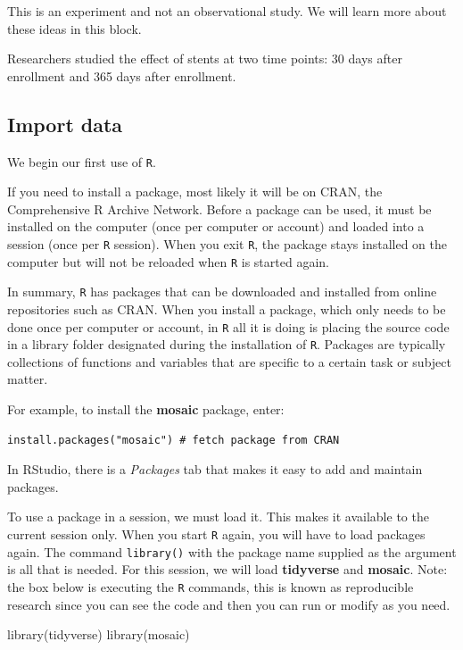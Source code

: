 \documentclass[
  letterpaper,
  DIV=11,
  numbers=noendperiod]{scrreprt}
\newenvironment{Shaded}{\begin{snugshade}}{\end{snugshade}}
\newcommand{\FunctionTok}[1]{\textcolor[rgb]{0.28,0.35,0.67}{#1}}
\newcommand{\NormalTok}[1]{\textcolor[rgb]{0.00,0.23,0.31}{#1}}
\begin{document}
This is an experiment and not an observational study. We will learn more
about these ideas in this block.

Researchers studied the effect of stents at two time points: 30 days
after enrollment and 365 days after enrollment.

\subsection{Import data}\label{import-data}

We begin our first use of \texttt{R}.

If you need to install a package, most likely it will be on CRAN, the
Comprehensive R Archive Network. Before a package can be used, it must
be installed on the computer (once per computer or account) and loaded
into a session (once per \texttt{R} session). When you exit \texttt{R},
the package stays installed on the computer but will not be reloaded
when \texttt{R} is started again.

In summary, \texttt{R} has packages that can be downloaded and installed
from online repositories such as CRAN. When you install a package, which
only needs to be done once per computer or account, in \texttt{R} all it
is doing is placing the source code in a library folder designated
during the installation of \texttt{R}. Packages are typically
collections of functions and variables that are specific to a certain
task or subject matter.

For example, to install the \textbf{mosaic} package, enter:

\begin{verbatim}
install.packages("mosaic") # fetch package from CRAN
\end{verbatim}

In RStudio, there is a \emph{Packages} tab that makes it easy to add and
maintain packages.

To use a package in a session, we must load it. This makes it available
to the current session only. When you start \texttt{R} again, you will
have to load packages again. The command \texttt{library()} with the
package name supplied as the argument is all that is needed. For this
session, we will load \textbf{tidyverse} and \textbf{mosaic}. Note: the
box below is executing the \texttt{R} commands, this is known as
reproducible research since you can see the code and then you can run or
modify as you need.

\begin{Shaded}
\begin{Highlighting}[]
\FunctionTok{library}\NormalTok{(tidyverse)}
\FunctionTok{library}\NormalTok{(mosaic)}
\end{Highlighting}
\end{Shaded}
\end{document}
